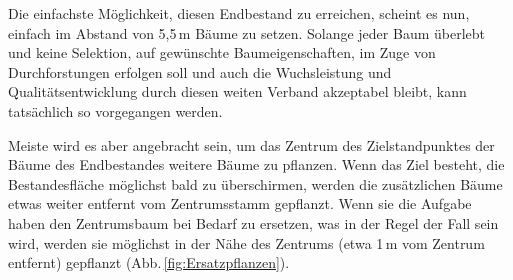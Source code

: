 \documentclass[twocolumn]{scrartcl}
\begin{document}
Die einfachste Möglichkeit, diesen Endbestand zu erreichen, scheint es nun,
einfach im Abstand von 5,5\,m Bäume zu setzen. Solange jeder Baum überlebt und
keine Selektion, auf gewünschte Baumeigenschaften, im Zuge von Durchforstungen
erfolgen soll und auch die Wuchsleistung und Qualitätsentwicklung durch diesen
weiten Verband akzeptabel bleibt, kann tatsächlich so vorgegangen werden.

Meiste wird es aber angebracht sein, um das Zentrum des Zielstandpunktes der
Bäume des Endbestandes weitere Bäume zu pflanzen. Wenn das Ziel besteht, die
Bestandesfläche möglichst bald zu überschirmen, werden die zusätzlichen Bäume
etwas weiter entfernt vom Zentrumsstamm gepflanzt. Wenn sie die Aufgabe haben
den Zentrumsbaum bei Bedarf zu ersetzen, was in der Regel der Fall sein wird,
werden sie möglichst in der Nähe des Zentrums (etwa 1\,m vom Zentrum entfernt)
gepflanzt (Abb.\,\ref{fig:Ersatzpflanzen}).
\end{document}
